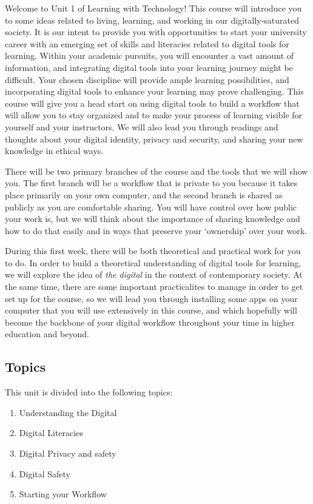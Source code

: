 \documentclass[
]{book}
\providecommand{\tightlist}{%
  \setlength{\itemsep}{0pt}\setlength{\parskip}{0pt}}
\theoremstyle{definition}
\theoremstyle{definition}
\theoremstyle{definition}
\theoremstyle{definition}
\theoremstyle{remark}
\begin{document}
Welcome to Unit 1 of Learning with Technology! This course will introduce you to some ideas related to living, learning, and working in our digitally-saturated society. It is our intent to provide you with opportunities to start your university career with an emerging set of skills and literacies related to digital tools for learning. Within your academic pursuits, you will encounter a vast amount of information, and integrating digital tools into your learning journey might be difficult. Your chosen discipline will provide ample learning possibilities, and incorporating digital tools to enhance your learning may prove challenging. This course will give you a head start on using digital tools to build a workflow that will allow you to stay organized and to make your process of learning visible for yourself and your instructors. We will also lead you through readings and thoughts about your digital identity, privacy and security, and sharing your new knowledge in ethical ways.

There will be two primary branches of the course and the tools that we will show you. The first branch will be a workflow that is private to you because it takes place primarily on your own computer, and the second branch is shared as publicly as you are comfortable sharing. You will have control over how public your work is, but we will think about the importance of sharing knowledge and how to do that easily and in ways that preserve your `ownership' over your work.

During this first week, there will be both theoretical and practical work for you to do. In order to build a theoretical understanding of digital tools for learning, we will explore the idea of \emph{the digital} in the context of contemporary society. At the same time, there are some important practicalites to manage in order to get set up for the course, so we will lead you through installing some apps on your computer that you will use extensively in this course, and which hopefully will become the backbone of your digital workflow throughout your time in higher education and beyond.

\hypertarget{topics}{%
\subsection*{Topics}\label{topics}}

This unit is divided into the following topics:

\begin{enumerate}
\def\labelenumi{\arabic{enumi}.}
\tightlist
\item
  Understanding the Digital\\
\item
  Digital Literacies\\
\item
  Digital Privacy and safety\\
\item
  Digital Safety\\
\item
  Starting your Workflow
\end{enumerate}
\end{document}
